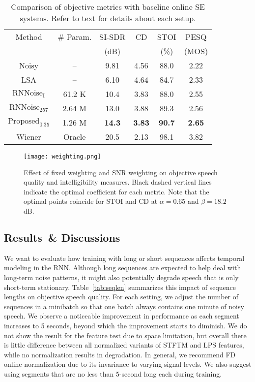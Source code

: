 \documentclass{article}
\begin{document}
\begin{table}[tb]
  \centering
  \caption{Comparison of objective metrics with baseline online SE systems. Refer to text for details about each setup.}
  \label{tab:obj}
  \begin{tabular}{c|c|c|c|c|c}
    Method&\# Param.&SI-SDR&CD&STOI&PESQ\\
          &         & (dB) & & (\%) & (MOS)\\
    \hline
    Noisy&--&9.81&4.56&88.0&2.22 \\
    LSA \cite{ephraim1985speech,tashev2009sound}&--&6.10&4.64&84.7&2.33 \\
    $\text{RNNoise}_\text{I}$ \cite{Reddy2019} &61.2 K&10.4&3.83&88.0&2.55 \\
    $\text{RNNoise}_{257}$ &2.64 M&13.0&3.88&89.3&2.56 \\
    $\text{Proposed}_{0.35}$&1.26 M&\bf{14.3}&\bf{3.83}&\bf{90.7}&\bf{2.65} \\
    Wiener&Oracle&20.5&2.13&98.1&3.82 \\
  \end{tabular}
  \vspace{-4mm}
\end{table}
\begin{figure*}[h]
  \texttt{[image: weighting.png]}
  \caption{Effect of fixed weighting and SNR weighting on objective speech quality and intelligibility measures. Black dashed vertical lines indicate the optimal coefficient for each metric. Note that the optimal points coincide for STOI and CD at $\alpha = 0.65$ and $\beta=18.2$ dB.}
  \label{fig:weighting}
\end{figure*}
\vspace{-2mm}
\subsection{Results~\& Discussions}
\vspace{-1mm}
We want to evaluate how training with long or short sequences affects temporal modeling in the RNN. Although long sequences are expected to help deal with long-term noise patterns, it might also potentially degrade speech that is only short-term stationary. Table~\ref{tab:seqlen} summarizes this impact of sequence lengths on objective speech quality. For each setting, we adjust the number of sequences in a minibatch so that one batch always contains one minute of noisy speech. We observe a noticeable improvement in performance as each segment increases to 5 seconds, beyond which the improvement starts to diminish. We do not show the result for the feature test due to space limitation, but overall there is little difference between all normalized variants of \ac{STFTM} and \ac{LPS} features, while no normalization results in degradation. In general, we recommend \ac{FD} online normalization due to its invariance to varying signal levels. We also suggest using segments that are no less than 5-second long each during training.
\end{document}
